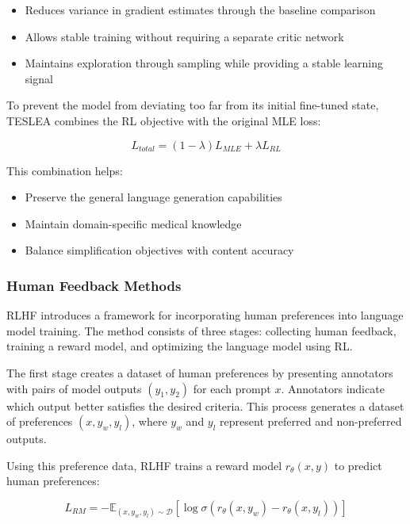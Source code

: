 \begin{itemize}
    \item Reduces variance in gradient estimates through the baseline comparison
    \item Allows stable training without requiring a separate critic network
    \item Maintains exploration through sampling while providing a stable learning signal
\end{itemize}

To prevent the model from deviating too far from its initial fine-tuned state, TESLEA combines the RL objective with the original MLE loss:

\begin{equation}
    L_{total} = (1 - \lambda)L_{MLE} + \lambda L_{RL}
\end{equation}

This combination helps:
\begin{itemize}
    \item Preserve the general language generation capabilities
    \item Maintain domain-specific medical knowledge
    \item Balance simplification objectives with content accuracy
\end{itemize}

\subsubsection{Human Feedback Methods}

RLHF introduces a framework for incorporating human preferences into language model training. The method consists of three stages: collecting human feedback, training a reward model, and optimizing the language model using RL.

The first stage creates a dataset of human preferences by presenting annotators with pairs of model outputs $(y_1, y_2)$ for each prompt $x$. Annotators indicate which output better satisfies the desired criteria. This process generates a dataset of preferences $(x, y_w, y_l)$, where $y_w$ and $y_l$ represent preferred and non-preferred outputs.

Using this preference data, RLHF trains a reward model $r_\theta(x,y)$ to predict human preferences:

\begin{equation}
    L_{RM} = -\mathbb{E}_{(x,y_w,y_l)\sim\mathcal{D}}[\log\sigma(r_\theta(x,y_w) - r_\theta(x,y_l))]
\end{equation}

